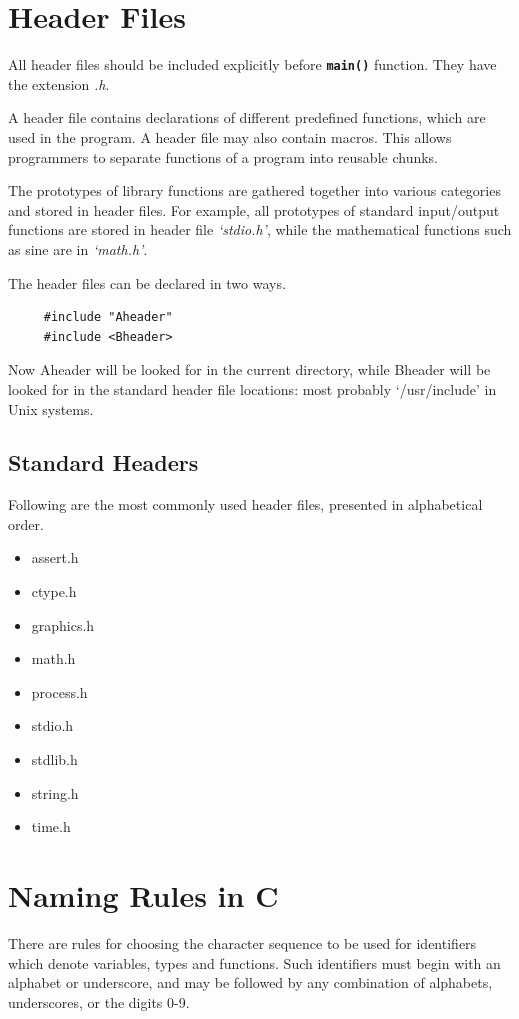 \documentclass[11pt,a4paper]{article}
\begin{document}
\section*{Header Files}
All header files should be included explicitly before \textbf{\texttt{main()}} function. They have the extension \emph{.h}.

A header file contains declarations of different predefined functions, which are used in the program. A header file may also contain macros. This allows programmers to separate functions of a program into reusable chunks. 

The prototypes of library functions are gathered together into various categories and stored in header files. For example, all prototypes of standard input/output functions are stored in header file \emph{`stdio.h'}, while the mathematical functions such as sine are in \emph{`math.h'}. 

The header files can be declared in two ways.

\begin{verbatim} 
     #include "Aheader"
     #include <Bheader>
\end{verbatim}

Now Aheader will be looked for in the current directory, while Bheader will be looked for in the standard header file locations: most probably `/usr/include' in Unix systems.

\subsection*{Standard Headers}
Following are the most commonly used header files, presented in alphabetical order.
\begin{itemize}
\item assert.h
\item ctype.h
\item graphics.h	
\item math.h
\item process.h
\item stdio.h
\item stdlib.h
\item string.h
\item time.h
\end{itemize}

\section*{Naming Rules in C}
There are rules for choosing the character sequence to be used for identifiers which denote variables, types and functions. Such identifiers must begin with an alphabet or underscore, and may be followed by any combination of alphabets, underscores, or the digits 0-9.
\end{document}
